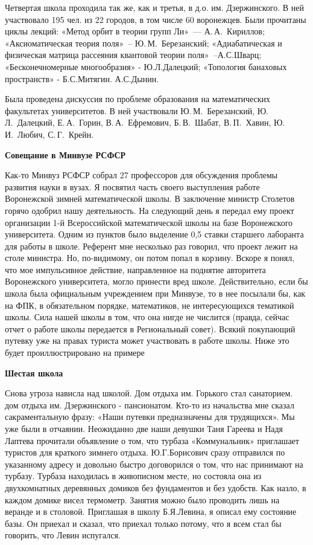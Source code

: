 Четвертая школа проходила так же, как и третья, в д.о. им. Дзержинского.
В ней участвовало 195 чел. из 22 городов, в том числе 60 воронежцев.
Были прочитаны циклы лекций:
«Метод орбит в теории групп Ли»~--- А.\,А.~Кириллов;
«Аксиоматическая теория поля»~-- Ю.\,М.~Березанский;
«Адиабатическая и физическая матрица рассеяния квантовой теории поля»~--А.С.Шварц;
«Бесконечномерные многообразия» - Ю.Л.Далецкий;
«Топология банаховых пространств» - Б.С.Митягин. А.С.Дынин.

Была проведена дискуссия по проблеме образования на математических факультетах университетов.
В ней участвовали Ю.\,М.~Березанский, Ю.\,Л.~Далецкий,
Е.\,А.~Горин, В.\,А.~Ефремович, Б.\,В.~Шабат, В.\,П.~Хавин, Ю.\,И.~Любич, С.\,Г.~Крейн.

{\bf Совещание в Минвузе РСФСР}

Как-то Минвуз РСФСР собрал 27 профессоров для обсуждения проблемы развития науки в вузах. Я посвятил часть своего выступления работе Воронежской зимней математической школы. В заключение министр Столетов горячо одобрил нашу деятельность. На следующий день я передал ему проект организации 1-й Всероссийской математической школы на базе Воронежского университета. Одним из пунктов было выделение 0,5 ставки старшего лаборанта для работы в школе. Референт мне несколько раз говорил, что проект лежит на столе министра. Но, по-видимому, он потом попал в корзину. Вскоре я понял, что мое импульсивное действие, направленное на поднятие авторитета Воронежского университета, могло принести вред школе. Действительно, если бы школа была официальным учреждением при Минвузе, то в нее посылали бы, как на ФПК, в обязательном порядке, математиков, не интересующихся тематикой школы. Сила нашей школы в том, что она нигде не числится (правда, сейчас отчет о работе школы передается в Региональный совет). Всякий покупающий путевку уже на правах туриста может участвовать в работе школы. Ниже это будет проиллюстрировано на примере

{\bf Шестая школа}

Снова угроза нависла над школой. Дом отдыха им. Горького стал санаторием. дом отдыха им. Дзержинского - пансионатом. Кто-то из начальства мне сказал сакраментальную фразу: «Наши путевки предназначены для трудящихся». Мы уже были в отчаянии. Неожиданно две наши девушки Таня Гареева и Надя Лаптева прочитали объявление о том, что турбаза «Коммунальник» приглашает туристов для краткого зимнего отдыха. Ю.Г.Борисович сразу отправился по указанному адресу и довольно быстро договорился о том, что нас принимают на турбазу. Турбаза находилась в живописном месте, но состояла она из двухкомнатных деревянных домиков без фундаментов и без удобств. Как назло, в каждом домике висел термометр. Занятия можно было проводить лишь на веранде и в столовой. Приглашая в школу Б.Я.Левина, я описал ему состояние базы. Он приехал и сказал, что приехал только потому, что я всем стал бы говорить, что Левин испугался.

